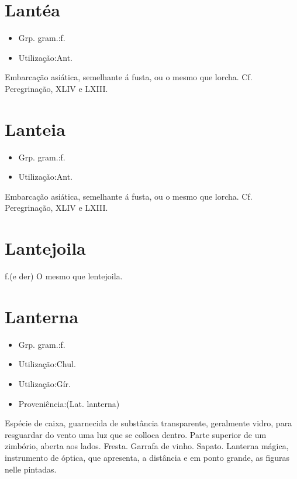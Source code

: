 \section{Lantéa}
\begin{itemize}
\item {Grp. gram.:f.}
\end{itemize}
\begin{itemize}
\item {Utilização:Ant.}
\end{itemize}
Embarcação asiática, semelhante á fusta, ou o mesmo que \textunderscore lorcha\textunderscore . Cf. \textunderscore Peregrinação\textunderscore , XLIV e LXIII.
\section{Lanteia}
\begin{itemize}
\item {Grp. gram.:f.}
\end{itemize}
\begin{itemize}
\item {Utilização:Ant.}
\end{itemize}
Embarcação asiática, semelhante á fusta, ou o mesmo que \textunderscore lorcha\textunderscore . Cf. \textunderscore Peregrinação\textunderscore , XLIV e LXIII.
\section{Lantejoila}
\textunderscore f.\textunderscore  (e der)
O mesmo que \textunderscore lentejoila\textunderscore .
\section{Lanterna}
\begin{itemize}
\item {Grp. gram.:f.}
\end{itemize}
\begin{itemize}
\item {Utilização:Chul.}
\end{itemize}
\begin{itemize}
\item {Utilização:Gír.}
\end{itemize}
\begin{itemize}
\item {Proveniência:(Lat. \textunderscore lanterna\textunderscore )}
\end{itemize}
Espécie de caixa, guarnecida de substância transparente, geralmente vidro, para resguardar do vento uma luz que se colloca dentro.
Parte superior de um zimbório, aberta aos lados.
Fresta.
Garrafa de vinho.
Sapato.
\textunderscore Lanterna mágica\textunderscore , instrumento de óptica, que apresenta, a distância e em ponto grande, as figuras nelle pintadas.
